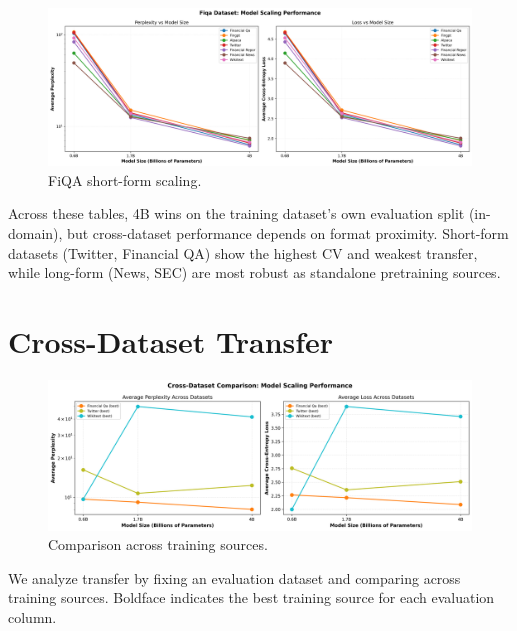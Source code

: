 {\tighttable
}

\begin{figure}[H]
  \centering
  \includegraphics[width=\textwidth]{../thesis/figures/scaling_fiqa.png}
  \caption{FiQA short-form scaling.}\label{fig:scaling_fiqa}
\end{figure}

{\tighttable
}

{\tighttable
}
{\tighttable
}
{\tighttable
}

Across these tables, 4B wins on the training dataset's own evaluation split (in-domain), but cross-dataset performance depends on format proximity. Short-form datasets (Twitter, Financial QA) show the highest CV and weakest transfer, while long-form (News, SEC) are most robust as standalone pretraining sources.

\section{Cross-Dataset Transfer}
\begin{figure}[H]
  \centering
  \includegraphics[width=\textwidth]{../thesis/figures/scaling_comparison_all.png}
  \caption{Comparison across training sources.}\label{fig:scaling_comparison_all}
\end{figure}

We analyze transfer by fixing an evaluation dataset and comparing across training sources. Boldface indicates the best training source for each evaluation column.

